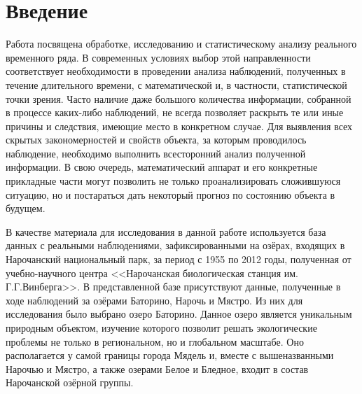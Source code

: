 
\newpage

\chapter*{Введение}

Работа посвящена обработке, исследованию и статистическому анализу реального временного ряда. В современных условиях выбор этой направленности соответствует необходимости в проведении анализа наблюдений, полученных в течение длительного времени, с математической и, в частности, статистической точки зрения. Часто наличие даже большого количества информации, собранной в процессе каких-либо наблюдений, не всегда позволяет раскрыть те или иные причины и следствия, имеющие место в конкретном случае. Для выявления всех скрытых закономерностей и свойств объекта, за которым проводилось наблюдение, необходимо выполнить всесторонний анализ полученной информации. В свою очередь, математический аппарат и его конкретные прикладные части могут позволить не только проанализировать сложившуюся ситуацию, но и постараться дать некоторый прогноз по состоянию объекта в будущем.

В качестве материала для исследования в данной работе используется база данных с реальными наблюдениями, зафиксированными на озёрах, входящих в Нарочанский национальный парк, за период с 1955 по 2012 годы, полученная от учебно-научного центра <<Нарочанская биологическая станция им. Г.Г.Винберга>>. В представленной базе присутствуют данные, полученные в ходе наблюдений за озёрами Баторино, Нарочь и Мястро. Из них для исследования было выбрано озеро Баторино. Данное озеро является уникальным природным объектом, изучение которого позволит решать экологические проблемы не только в региональном, но и глобальном масштабе. Оно располагается у самой границы города Мядель и, вместе с вышеназванными Нарочью и Мястро, а также озерами Белое и Бледное, входит в состав Нарочанской озёрной группы.

